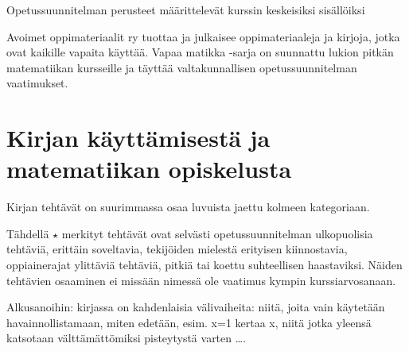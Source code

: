 Opetussuunnitelman perusteet määrittelevät kurssin keskeisiksi sisällöiksi

Avoimet oppimateriaalit ry tuottaa ja julkaisee oppimateriaaleja ja kirjoja, jotka ovat kaikille vapaita käyttää. Vapaa matikka -sarja on suunnattu lukion pitkän matematiikan kursseille ja täyttää valtakunnallisen opetussuunnitelman vaatimukset.

\newpage

\section*{Kirjan käyttämisestä ja matematiikan opiskelusta}

Kirjan tehtävät on suurimmassa osaa luvuista jaettu kolmeen kategoriaan.

Tähdellä $\star$ merkityt tehtävät ovat selvästi opetussuunnitelman ulkopuolisia tehtäviä, erittäin soveltavia, tekijöiden mielestä erityisen kiinnostavia, oppiainerajat ylittäviä tehtäviä, pitkiä tai koettu suhteellisen haastaviksi. Näiden tehtävien osaaminen ei missään nimessä ole vaatimus kympin kurssiarvosanaan.

Alkusanoihin: kirjassa on kahdenlaisia välivaiheita: niitä, joita vain käytetään havainnollistamaan, miten edetään, esim. x=1 kertaa x, niitä jotka yleensä katsotaan välttämättömiksi pisteytystä varten \ldots.
\newpage
